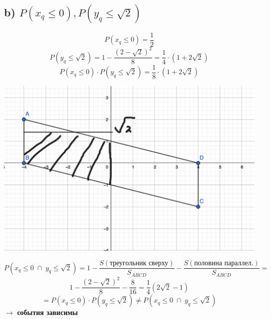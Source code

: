 \documentclass[a4paper,12pt]{article}
\begin{document}
\subsection*{b) $P(x_q \leq 0), P(y_q \leq \sqrt{2})$}
\[
P(x_q \leq 0) = \frac{1}{2}
\]
\[
P(y_q \leq \sqrt{2}) = 1 - \frac{(2 - \sqrt{2})^2}{8} = \frac{1}{4} \cdot (1 + 2\sqrt{2})
\]
\[
P(x_q \leq 0) \cdot P(y_q \leq \sqrt{2}) = \frac{1}{8} \cdot (1 + 2\sqrt{2})
\]
\begin{center}
\includegraphics[scale=0.4]{4.png}
\end{center}
\[
P(x_q \leq 0 \; \cap \; y_q \leq \sqrt{2}) =  1 - 
\frac{S(\text{треугольник сверху})}{S_{ABCD}} - \frac{S(\text{половина параллел.})}{S_{ABCD}} = 
\]
\[
1 - \frac{(2-\sqrt{2})^2}{8} - \frac{8}{16} = \frac{1}{4} \left(2\sqrt{2} - 1\right)
\]
\[
= P(x_q \leq 0) \cdot P(y_q \leq \sqrt{2}) \neq P(x_q \leq 0 \; \cap \; y_q \leq \sqrt{2})
\]
$\rightarrow$ \textbf{события зависимы}
\end{document}
